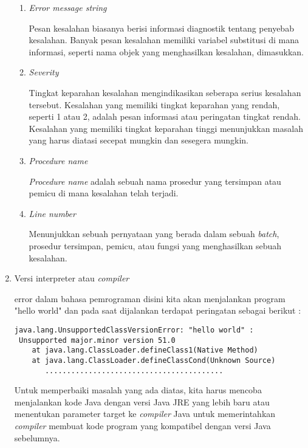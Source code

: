 \begin{enumerate}
\begin{enumerate}
\item \textit{Error message string}
\par 
Pesan kesalahan biasanya berisi informasi diagnostik tentang penyebab kesalahan. Banyak pesan kesalahan memiliki variabel substitusi di mana informasi, seperti nama objek yang menghasilkan kesalahan, dimasukkan.
\item \textit{Severity}
\par 
Tingkat keparahan kesalahan mengindikasikan seberapa serius kesalahan tersebut. Kesalahan yang memiliki tingkat keparahan yang rendah, seperti 1 atau 2, adalah pesan informasi atau peringatan tingkat rendah. Kesalahan yang memiliki tingkat keparahan tinggi menunjukkan masalah yang harus diatasi secepat mungkin dan sesegera mungkin.
\item \textit{Procedure name}
\par 
\textit{Procedure name} adalah sebuah nama prosedur yang tersimpan atau pemicu di mana kesalahan telah terjadi.
\item \textit{Line number}
\par 
Menunjukkan sebuah pernyataan yang berada dalam sebuah \textit{batch}, prosedur tersimpan, pemicu, atau fungsi yang menghasilkan sebuah kesalahan.
\end{enumerate}
\item Versi interpreter atau \textit{compiler}
\par 
error dalam bahasa pemrograman disini kita akan menjalankan program "hello world" dan pada saat dijalankan terdapat peringatan sebagai berikut :
\begin{verbatim}
java.lang.UnsupportedClassVersionError: "hello world" :
 Unsupported major.minor version 51.0
    at java.lang.ClassLoader.defineClass1(Native Method)
    at java.lang.ClassLoader.defineClassCond(Unknown Source)
       .........................................
\end{verbatim}
Untuk memperbaiki masalah yang ada diatas, kita harus mencoba menjalankan kode Java dengan versi Java JRE yang lebih baru atau menentukan parameter target ke \textit{compiler} Java untuk memerintahkan \textit{compiler} membuat kode program yang kompatibel dengan versi Java sebelumnya.
\end{enumerate}